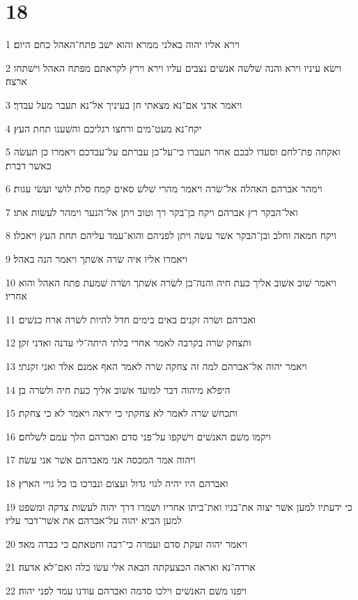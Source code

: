 \chapter{18}

\par 1 וירא אליו יהוה באלני ממרא והוא ישׁב פתח־האהל כחם היום׃
\par 2 וישׂא עיניו וירא והנה שׁלשׁה אנשׁים נצבים עליו וירא וירץ לקראתם מפתח האהל וישׁתחו ארצה׃
\par 3 ויאמר אדני אם־נא מצאתי חן בעיניך אל־נא תעבר מעל עבדך׃
\par 4 יקח־נא מעט־מים ורחצו רגליכם והשׁענו תחת העץ׃
\par 5 ואקחה פת־לחם וסעדו לבכם אחר תעברו כי־על־כן עברתם על־עבדכם ויאמרו כן תעשׂה כאשׁר דברת׃
\par 6 וימהר אברהם האהלה אל־שׂרה ויאמר מהרי שׁלשׁ סאים קמח סלת לושׁי ועשׂי עגות׃
\par 7 ואל־הבקר רץ אברהם ויקח בן־בקר רך וטוב ויתן אל־הנער וימהר לעשׂות אתו׃
\par 8 ויקח חמאה וחלב ובן־הבקר אשׁר עשׂה ויתן לפניהם והוא־עמד עליהם תחת העץ ויאכלו׃
\par 9 ויאמרו אליו איה שׂרה אשׁתך ויאמר הנה באהל׃
\par 10 ויאמר שׁוב אשׁוב אליך כעת חיה והנה־בן לשׂרה אשׁתך ושׂרה שׁמעת פתח האהל והוא אחריו׃
\par 11 ואברהם ושׂרה זקנים באים בימים חדל להיות לשׂרה ארח כנשׁים׃
\par 12 ותצחק שׂרה בקרבה לאמר אחרי בלתי היתה־לי עדנה ואדני זקן׃
\par 13 ויאמר יהוה אל־אברהם למה זה צחקה שׂרה לאמר האף אמנם אלד ואני זקנתי׃
\par 14 היפלא מיהוה דבר למועד אשׁוב אליך כעת חיה ולשׂרה בן׃
\par 15 ותכחשׁ שׂרה לאמר לא צחקתי כי יראה ויאמר לא כי צחקת׃
\par 16 ויקמו משׁם האנשׁים וישׁקפו על־פני סדם ואברהם הלך עמם לשׁלחם׃
\par 17 ויהוה אמר המכסה אני מאברהם אשׁר אני עשׂה׃
\par 18 ואברהם היו יהיה לגוי גדול ועצום ונברכו בו כל גויי הארץ׃
\par 19 כי ידעתיו למען אשׁר יצוה את־בניו ואת־ביתו אחריו ושׁמרו דרך יהוה לעשׂות צדקה ומשׁפט למען הביא יהוה על־אברהם את אשׁר־דבר עליו׃
\par 20 ויאמר יהוה זעקת סדם ועמרה כי־רבה וחטאתם כי כבדה מאד׃
\par 21 ארדה־נא ואראה הכצעקתה הבאה אלי עשׂו כלה ואם־לא אדעה׃
\par 22 ויפנו משׁם האנשׁים וילכו סדמה ואברהם עודנו עמד לפני יהוה׃
